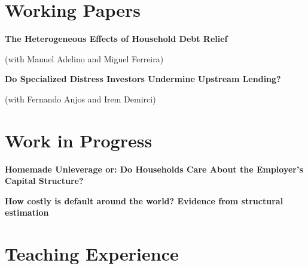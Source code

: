 \documentclass[letterpaper]{article}
\newenvironment{itemize*}{
  \begin{list}{}{
    \setlength{\leftmargin}{1.5em}
  }
}{
  \end{list}
}
\begin{document}
\section*{Working Papers}

\begin{itemize*}
\item \textbf{The Heterogeneous Effects of Household Debt Relief}

	(with Manuel Adelino and Miguel Ferreira)
\medskip
	
\item \textbf{Do Specialized Distress Investors Undermine Upstream Lending?}

	(with Fernando Anjos and Irem Demirci)

\end{itemize*}

\section*{Work in Progress}

\begin{itemize*}
\item \textbf{Homemade Unleverage or: Do Households Care About the Employer's Capital Structure?}
\item \textbf{How costly is default around the world? Evidence from structural estimation}
\end{itemize*}

\section*{Teaching Experience}
\end{document}
